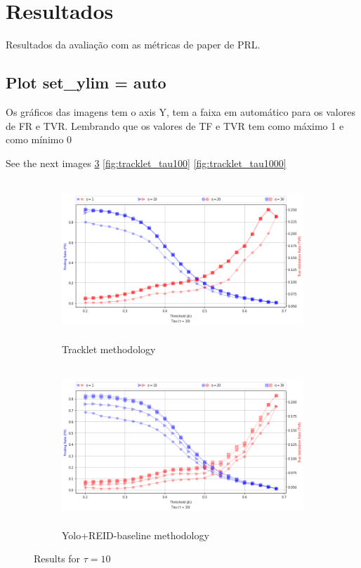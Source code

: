 \documentclass{article}
\begin{document}
\section{Resultados}

Resultados da avaliação com as métricas de paper de PRL.

\subsection{Plot \textbf{set\_ylim} = auto}
Os gráficos das imagens tem o axis Y, tem a faixa  em automático para os valores de FR e TVR. Lembrando que os valores de TF e TVR tem como máximo 1 e como mínimo 0

See the next images \ref{fig:tracklet_tau10}  \ref{fig:tracklet_tau100}  \ref{fig:tracklet_tau1000}

\begin{figure}[H]
    \begin{subfigure}{0.8\textwidth}
        \includegraphics[width=11cm, height=6cm]{images_results/tracklet_tau10.png} 
        \caption{Tracklet methodology}
        \label{fig:subim1}
    \end{subfigure}
    
    \begin{subfigure}{0.9\textwidth}
        \includegraphics[width=11cm, height=6cm]{images_results/yolo_tau10.png}
        \caption{Yolo+REID-baseline methodology}
        \label{fig:subim2}
    \end{subfigure}

\caption{Results for $\tau = 10$}
\label{fig:tracklet_tau10}
\end{figure}
\end{document}
